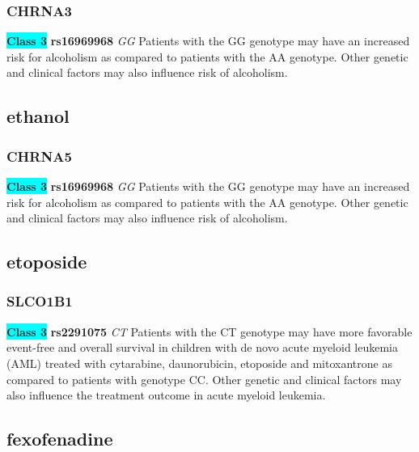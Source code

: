 \documentclass{book}
\begin{document}
\subsubsection{ CHRNA3 }

\begin{center}
\textbf{\colorbox{cyan} {Class 3}} \textbf{ rs16969968 } \textit{ GG }
Patients with the GG genotype may have an increased risk for alcoholism as compared to patients with the AA genotype. Other genetic and clinical factors may also influence risk of alcoholism.


\end{center}\subsection{ ethanol }


\subsubsection{ CHRNA5 }

\begin{center}
\textbf{\colorbox{cyan} {Class 3}} \textbf{ rs16969968 } \textit{ GG }
Patients with the GG genotype may have an increased risk for alcoholism as compared to patients with the AA genotype. Other genetic and clinical factors may also influence risk of alcoholism.


\end{center}\subsection{ etoposide }


\subsubsection{ SLCO1B1 }

\begin{center}
\textbf{\colorbox{cyan} {Class 3}} \textbf{ rs2291075 } \textit{ CT }
Patients with the CT genotype may have more favorable event-free and overall survival in children with de novo acute myeloid leukemia (AML) treated with cytarabine, daunorubicin, etoposide and mitoxantrone as compared to patients with genotype CC. Other genetic and clinical factors may also influence the treatment outcome in acute myeloid leukemia.


\end{center}\subsection{ fexofenadine }
\end{document}
